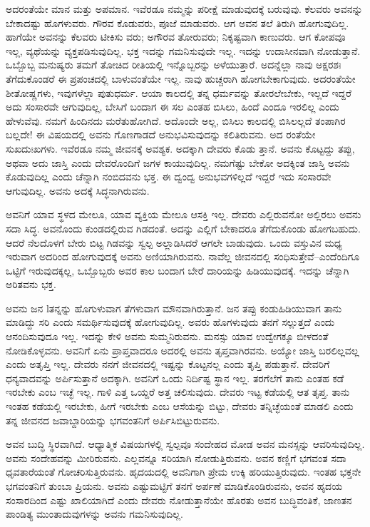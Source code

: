 ಅದರಂತೆಯೇ ಮಾನ ಮತ್ತು ಅಪಮಾನ. ಇವೆರಡೂ ನಮ್ಮನ್ನು ಪರೀಕ್ಷೆ ಮಾಡುವುದಕ್ಕೆ ಬರುವುವು. ಕೆಲವರು ಅವನನ್ನು ಬೇಕಾದಷ್ಟು ಹೊಗಳುವರು. ಗೌರವ ಕೊಡುವರು, ಪೂಜೆ ಮಾಡುವರು. ಆಗ ಅವನ ತಲೆ ತಿರುಗಿ ಹೋಗುವುದಿಲ್ಲ. ಹಾಗೆಯೇ ಅವನನ್ನು ಕೆಲವರು ಟೀಕಿಸು ವರು; ಅಗೌರವ ತೋರುವರು; ನಿಕೃಷ್ಟವಾಗಿ ಕಾಣುವರು. ಆಗ ಕೋಪವೂ ಇಲ್ಲ, ವ್ಯಥೆಯನ್ನು ವ್ಯಕ್ತಪಡಿಸುವುದಿಲ್ಲ. ಭಕ್ತ ಇದನ್ನು ಗಮನಿಸುವುದೇ ಇಲ್ಲ. ಇದನ್ನು ಉದಾಸೀನವಾಗಿ ನೋಡುತ್ತಾನೆ. ಒಬ್ಬೊಬ್ಬ ಮನುಷ್ಯರು ತಮಗೆ ತೋಚಿದ ರೀತಿಯಲ್ಲಿ ಇನ್ನೊಬ್ಬರನ್ನು ಅಳೆಯುತ್ತಾರೆ. ಅದನ್ನೆಲ್ಲಾ ನಾವು ಅಕ್ಷರಶಃ ತೆಗೆದುಕೊಂಡರೆ ಈ ಪ್ರಪಂಚದಲ್ಲಿ ಬಾಳುವಂತೆಯೇ ಇಲ್ಲ. ನಾವು ಹುಚ್ಚರಾಗಿ ಹೋಗಬೇಕಾಗುವುದು. ಅದರಂತೆಯೇ ಶೀತೋಷ್ಣಗಳು, ಇವುಗಳೆಲ್ಲಾ ಪುತುಧರ್ಮ. ಆಯಾ ಕಾಲದಲ್ಲಿ ತನ್ನ ಧರ್ಮವನ್ನು ತೋರಲೇಬೇಕು, ಇಲ್ಲದೆ ಇದ್ದರೆ ಅದು ಸಂಸಾರವೇ ಆಗುವುದಿಲ್ಲ, ಬೇಸಿಗೆ ಬಂದಾಗ ಈ ಸಲ ಎಂತಹ ಬಿಸಿಲು, ಹಿಂದೆ ಎಂದೂ ಇರಲಿಲ್ಲ ಎಂದು ಹೇಳುವೆವು. ನಮಗೆ ಹಿಂದಿನದು ಮರೆತುಹೋಗಿದೆ. ಅದೊಂದೇ ಅಲ್ಲ, ಬಿಸಿಲು ಕಾಲದಲ್ಲಿ ಬಿಸಿಲಲ್ಲದೆ ತಂಪಾಗಿರ ಬಲ್ಲದೇ! ಈ ವಿಷಯದಲ್ಲಿ ಅವನು ಗೊಣಗಾಡದೆ ಅನುಭವಿಸುವುದನ್ನು ಕಲಿತಿರುವನು. ಅದ ರಂತೆಯೇ ಸುಖದುಃಖಗಳು. ಇವೆರಡೂ ನಮ್ಮ ಜೀವನಕ್ಕೆ ಅವಶ್ಯಕ. ಅದಕ್ಕಾಗಿ ದೇವರು ಕೊಡು ತ್ತಾನೆ. ಅವನು ಕೊಟ್ಟದ್ದು ತಪ್ಪು, ಅಥವಾ ಅದು ಜಾಸ್ತಿ ಎಂದು ದೇವರೊಂದಿಗೆ ಜಗಳ ಕಾಯುವುದಿಲ್ಲ. ನಮಗೆಷ್ಟು ಬೇಕೋ ಅದಕ್ಕಿಂತ ಜಾಸ್ತಿ ಅವನು ಕೊಡುವುದಿಲ್ಲ ಎಂದು ಚೆನ್ನಾಗಿ ನಂಬಿದವನು ಭಕ್ತ. ಈ ದ್ವಂದ್ವ ಅನುಭವಗಳಿಲ್ಲದೆ ಇದ್ದರೆ ಇದು ಸಂಸಾರವೇ ಆಗುವುದಿಲ್ಲ. ಅವನು ಅದಕ್ಕೆ ಸಿದ್ಧನಾಗಿರುವನು.

ಅವನಿಗೆ ಯಾವ ಸ್ಥಳದ ಮೇಲೂ, ಯಾವ ವ್ಯಕ್ತಿಯ ಮೇಲೂ ಆಸಕ್ತಿ ಇಲ್ಲ. ದೇವರು ಎಲ್ಲಿರುವನೋ ಅಲ್ಲಿರಲು ಅವನು ಸದಾ ಸಿದ್ಧ. ಅವನೊಂದು ಕುಂಡದಲ್ಲಿರುವ ಗಿಡದಂತೆ. ಅದನ್ನು ಎಲ್ಲಿಗೆ ಬೇಕಾದರೂ ತೆಗೆದುಕೊಂಡು ಹೋಗಬಹುದು. ಆದರೆ ನೆಲದೊಳಗೆ ಬೇರು ಬಿಟ್ಟ ಗಿಡವನ್ನು ಸ್ವಲ್ಪ ಅಲ್ಲಾಡಿಸಿದರೆ ಆಗಲೇ ಬಾಡುವುದು. ಒಂದು ವಸ್ತುವಿನ ಮಧ್ಯ ಇರುವಾಗ ಅದರಿಂದ ಹೋಗುವುದಕ್ಕೆ ಅವನು ಅಣಿಯಾಗಿರುವನು. ನಾವೆಲ್ಲ ಜೀವನದಲ್ಲಿ ಸಂಧಿಸುತ್ತೇವೆ–ಎಂದೆಂದಿಗೂ ಒಟ್ಟಿಗೆ ಇರುವುದಕ್ಕಲ್ಲ, ಒಬ್ಬೊಬ್ಬರು ಅವರ ಕಾಲ ಬಂದಾಗ ಬೇರೆ ದಾರಿಯನ್ನು ಹಿಡಿಯುವುದಕ್ಕೆ. ಇದನ್ನು ಚೆನ್ನಾಗಿ ಅರಿತವನು ಭಕ್ತ. 

ಅವನು ಜನ lತನ್ನನ್ನು ಹೊಗುಳುವಾಗ ತೆಗಳುವಾಗ ಮೌನವಾಗಿರುತ್ತಾನೆ. ಜನ ತಪ್ಪು ಕಂಡುಹಿಡಿಯುವಾಗ ತಾನು ಮಾಡಿದ್ದು ಸರಿ ಎಂದು ಸಮರ್ಥಿಸುವುದಕ್ಕೆ ಹೋಗುವುದಿಲ್ಲ. ಅವರು ಹೊಗಳುವುದು ತನಗೆ ಸಲ್ಲುತ್ತದೆ ಎಂದು ಆನಂದಿಸುವುದೂ ಇಲ್ಲ. ಇದನ್ನು ಕೇಳಿ ಅವನು ಸುಮ್ಮನಿರುವನು. ಮನಸ್ಸು ಯಾವ ಉದ್ವೇಗಕ್ಕೂ ಬೀಳದಂತೆ ನೋಡಿಕೊಳ್ಳವನು. ಅವನಿಗೆ ಏನು ಪ್ರಾಪ್ತವಾದರೂ ಅದರಲ್ಲಿ ಅವನು ತೃಪ್ತವಾಗಿರವನು. ಅಯ್ಯೋ ಜಾಸ್ತಿ ಬರಲಿಲ್ಲವಲ್ಲ ಎಂದು ಅತೃಪ್ತಿ ಇಲ್ಲ. ದೇವರು ನನಗೆ ಜೀವನದಲ್ಲಿ ಇಷ್ಟನ್ನು ಕೊಟ್ಟನಲ್ಲ ಎಂದು ತೃಪ್ತಿ ಪಡುತ್ತಾನೆ. ದೇವರಿಗೆ ಧನ್ಯವಾದವನ್ನು ಅರ್ಪಿಸುತ್ತಾನೆ ಅದಕ್ಕಾಗಿ. ಅವನಿಗೆ ಒಂದು ನಿರ್ದಿಷ್ಟ ಸ್ಥಾನ ಇಲ್ಲ. ತರಗೆಲೆಗೆ ತಾನು ಎಂತಹ ಕಡೆ ಇರಬೇಕು ಎಂಬ ಇಚ್ಛೆ ಇಲ್ಲ. ಗಾಳಿ ಎತ್ತ ಒಯ್ದರೆ ಅತ್ತ ಚಲಿಸುವುದು. ದೇವರು ಇಟ್ಟ ಕಡೆಯಲ್ಲಿ ಆತ ತೃಪ್ತ. ತಾನು ಇಂತಹ ಕಡೆಯಲ್ಲಿ ಇರಬೇಕು, ಹೀಗೆ ಇರಬೇಕು ಎಂಬ ಆಸೆಯನ್ನು ಬಿಟ್ಟು, ದೇವರು ತನ್ನಿಚ್ಛೆಯಂತೆ ಮಾಡಲಿ ಎಂದು ತನ್ನ ಜೀವನದ ಜವಾಬ್ದಾರಿಯನ್ನು ಭಗವಂತನಿಗೆ ಅರ್ಪಿಸಿಬಿಟ್ಟುರುವನು.

ಅವನ ಬುದ್ಧಿ ಸ್ಥಿರವಾಗಿದೆ. ಆಧ್ಯಾತ್ಮಿಕ ವಿಷಯಗಳಲ್ಲಿ ಸ್ವಲ್ಪವೂ ಸಂದೇಹದ ಮೋಡ ಅವನ ಮನಸ್ಸನ್ನು ಆವರಿಸುವುದಿಲ್ಲ. ಅವನು ಸಂದೇಹವನ್ನು ಮೀರಿರುವನು. ಎಲ್ಲವನ್ನೂ ಸರಿಯಾಗಿ ನೋಡುತ್ತಿರುವನು. ಅವನ ಕಣ್ಣಿಗೆ ಭಗವಂತ ಸದಾ ಧೃವತಾರೆಯಂತೆ ಗೋಚರಿಸುತ್ತಿರುವನು. ಹೃದಯದಲ್ಲಿ ಅವನಿಗಾಗಿ ಪ್ರೇಮ ಉಕ್ಕಿ ಹರಿಯುತ್ತಿರುವುದು. ಇಂತಹ ಭಕ್ತನೇ ಭಗವಂತನಿಗೆ ತುಂಬಾ ಪ್ರಿಯನು. ಅವನು ಎಷ್ಟುಮಟ್ಟಿಗೆ ತನಗೆ ಅರ್ಪಣೆ ಮಾಡಿಕೊಂಡಿರುವನು, ಅವನ ಹೃದಯ ಸಂಸಾರದಿಂದ ಎಷ್ಟು ಖಾಲಿಯಾಗಿದೆ ಎಂದು ದೇವರು ನೋಡುತ್ತಾನೆಯೇ ಹೊರತು ಅವನ ಬುದ್ಧಿವಂತಿಕೆ, ಜಾಣತನ ಪಾಂಡಿತ್ಯ ಮುಂತಾದುವುಗಳನ್ನು ಅವನು ಗಮನಿಸುವುದಿಲ್ಲ.

